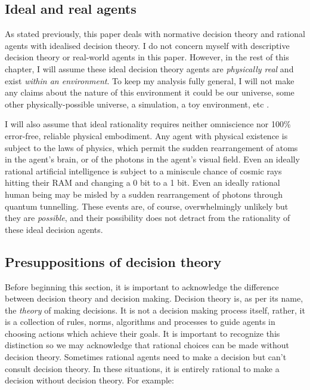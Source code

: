 \documentclass{article}
\begin{document}
\subsection{Ideal and real agents}

As stated previously, this paper deals with normative decision theory and rational agents with idealised decision theory. I do not concern myself with descriptive decision theory or real-world agents in this paper. However, in the rest of this chapter, I will assume these ideal decision theory agents are \textit{physically real} and exist \textit{within an environment}. To keep my analysis fully general, I will not make any claims about the nature of this environment \textemdash{} it could be our universe, some other physically-possible universe, a simulation, a toy environment, etc \textemdash{}.

I will also assume that ideal rationality requires neither omniscience nor 100\% error-free, reliable physical embodiment. Any agent with physical existence is subject to the laws of physics, which permit the sudden rearrangement of atoms in the agent's brain, or of the photons in the agent's visual field. Even an ideally rational artificial intelligence is subject to a miniscule chance of cosmic rays hitting their RAM and changing a 0 bit to a 1 bit. Even an ideally rational human being may be misled by a sudden rearrangement of photons through quantum tunnelling. These events are, of course, overwhelmingly unlikely \textemdash{} but they are \textit{possible}, and their possibility does not detract from the rationality of these ideal decision agents.

\subsection{Presuppositions of decision theory}

Before beginning this section, it is important to acknowledge the difference between decision theory and decision making. Decision theory is, as per its name, the \textit{theory} of making decisions. It is not a decision making process itself, rather, it is a collection of rules, norms, algorithms and processes to guide agents in choosing actions which achieve their goals. It is important to recognize this distinction so we may acknowledge that rational choices can be made without decision theory. Sometimes rational agents need to make a decision but can't consult decision theory. In these situations, it is entirely rational to make a decision without decision theory. For example:
\end{document}
